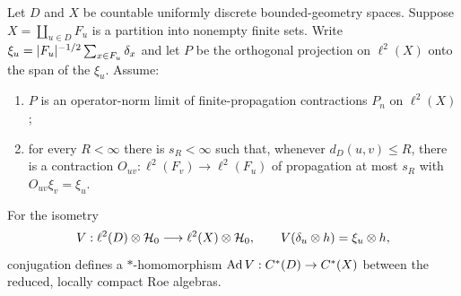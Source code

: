 \begin{proposition}\label{prop:transfer}
Let $D$ and $X$ be countable uniformly discrete bounded-geometry spaces.
Suppose $X=\coprod_{u\in D}F_u$ is a partition into nonempty finite sets.
Write $\xi_u=\lvert F_u\rvert^{-1/2}\sum_{x\in F_u}\delta_x$ and let $P$ be the
orthogonal projection on $\ell^2(X)$ onto the span of the $\xi_u$.
Assume:
\begin{enumerate}
\item $P$ is an operator-norm limit of finite-propagation contractions $P_n$
on $\ell^2(X)$;
\item for every $R<\infty$ there is $s_R<\infty$ such that, whenever
$d_D(u,v)\le R$, there is a contraction
$O_{uv}:\ell^2(F_v)\to\ell^2(F_u)$ of propagation at most $s_R$ with
$O_{uv}\xi_v=\xi_u$.
\end{enumerate}
For the isometry
\[
 V:\ell^2(D)\otimes\mathcal H_0\longrightarrow\ell^2(X)\otimes\mathcal H_0,
 \qquad V(\delta_u\otimes h)=\xi_u\otimes h,
\]
conjugation defines a $*$-homomorphism
$\operatorname{Ad} V:C^*(D)\to C^*(X)$ between the reduced, locally compact Roe algebras.
\end{proposition}
